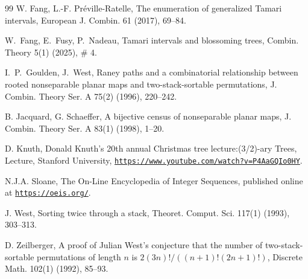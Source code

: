 \documentclass[a4paper,11pt,reqno]{amsart}
\theoremstyle{definition}
\numberwithin{equation}{section}
\begin{document}
\begin{thebibliography}{99}
W. Fang, L.-F. Pr\'{e}ville-Ratelle, The enumeration of generalized Tamari intervals, European J. Combin. 61 (2017), 69--84.

W.~Fang, E.~Fusy, P.~Nadeau, Tamari intervals and blossoming trees, Combin. Theory 5(1) (2025), \# 4.


I.~P.~Goulden, J.~West, Raney paths and a combinatorial relationship between rooted nonseparable planar maps and two-stack-sortable permutations, J. Combin. Theory Ser. A 75(2) (1996), 220--242.

B. Jacquard, G. Schaeffer, A bijective census of nonseparable planar maps, J. Combin. Theory Ser. A 83(1) (1998), 1--20.


D. Knuth, Donald Knuth’s 20th annual Christmas tree lecture:(3/2)-ary Trees, Lecture, Stanford University, 
{\tt \href{https://www.youtube.com/watch?v=P4AaGQIo0HY}{https://www.youtube.com/watch?v=P4AaGQIo0HY}}.


 N.J.A. Sloane, The On-Line Encyclopedia of Integer Sequences, published online at {\tt \href{https://oeis.org/}{https://oeis.org/}}.

J. West, Sorting twice through a stack, Theoret. Comput. Sci. 117(1) (1993), 303--313.

D. Zeilberger, A proof of Julian West’s conjecture that the number of two-stack-sortable permutations of length $n$ is $2(3n)!/((n + 1)!(2n + 1)!)$, Discrete Math. 102(1) (1992), 85--93.


\end{thebibliography}
\end{document}
